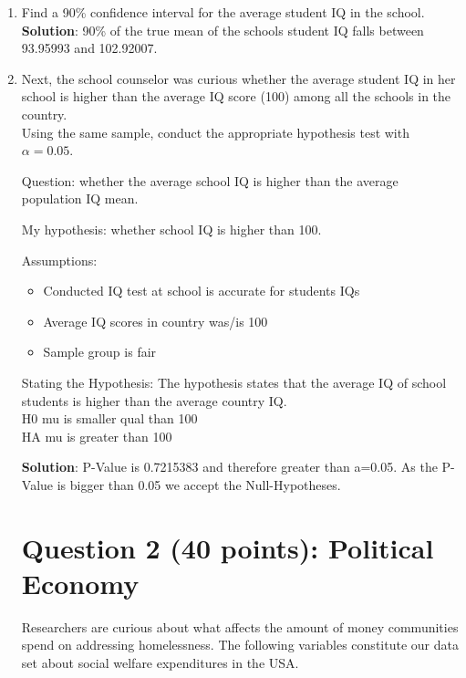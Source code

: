 \documentclass[12pt,letterpaper]{article}
\begin{document}
\begin{enumerate}
	\item Find a 90\% confidence interval for the average student IQ in the school.\\

\textbf{Solution}: 90\% of the true mean of the schools student IQ falls between 93.95993 and 102.92007.
	
	  
	
	\item Next, the school counselor was curious  whether  the average student IQ in her school is higher than the average IQ score (100) among all the schools in the country.\\ 
	
	\noindent Using the same sample, conduct the appropriate hypothesis test with $\alpha=0.05$.
	 
Question: whether the average school IQ is higher than the average population IQ mean. 

My hypothesis: whether school IQ is higher than 100. 

Assumptions:
\begin{itemize}
\item Conducted IQ test at school is accurate for students IQs
\item Average IQ scores in country was/is 100
\item Sample group is fair
\end{itemize}

Stating the Hypothesis: The hypothesis states that the average IQ of school students is higher than the average country IQ.\\
H0 mu is smaller qual than  100 \\
HA mu is greater than 100

		  

\textbf{Solution}: P-Value is 0.7215383 and therefore greater than a=0.05. As the P-Value is bigger than 0.05 we accept the Null-Hypotheses.

\newpage

	\section*{Question 2 (40 points): Political Economy}

\noindent Researchers are curious about what affects the amount of money communities spend on addressing homelessness. The following variables constitute our data set about social welfare expenditures in the USA. \\
\vspace{.5cm}



\end{enumerate}
\end{document}
